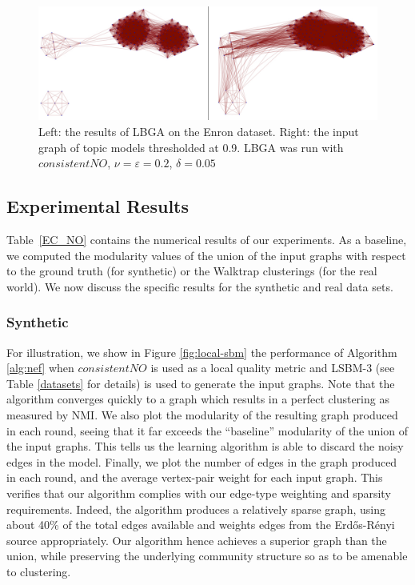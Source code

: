 \documentclass{article}
\newcommand{\er}{Erd\H{o}s-R\'{e}nyi }
\begin{document}
\begin{figure}[t]
\begin{centering}
\includegraphics[width=\columnwidth]{enron-comparison.pdf}
\par\end{centering}
\caption{Left: the results of LBGA on the Enron dataset. Right: the input graph
of topic models thresholded at 0.9. LBGA was run with $consistentNO$, $\nu =
\varepsilon = 0.2$, $\delta = 0.05$} 
\label{fig:enron-comparison}
\end{figure}


\subsection{Experimental Results}
\label{sec:results}

Table~\ref{EC_NO} contains the numerical results of our experiments. As a
baseline, we computed the modularity values of the union of the input
graphs with respect to the ground truth (for synthetic) or the Walktrap
clusterings (for the real world). We now discuss the specific results for the
synthetic and real data sets. 

\subsubsection{Synthetic}
For illustration, we show in Figure \ref{fig:local-sbm} the performance of
Algorithm \ref{alg:nef} when $consistentNO$ is used as a local quality metric
and LSBM-3 (see Table \ref{datasets} for details) is used to generate the input
graphs. Note that the algorithm converges quickly to a graph which results in a
perfect clustering as measured by NMI. We also plot the modularity of the
resulting graph produced in each round, seeing that it far exceeds the
``baseline'' modularity of the union of the input graphs. This tells us the
learning algorithm is able to discard the noisy edges in the model. Finally, we
plot the number of edges in the graph produced in each round, and the average
vertex-pair weight for each input graph. This verifies that our algorithm
complies with our edge-type weighting and sparsity requirements. Indeed, the
algorithm produces a relatively sparse graph, using about 40\% of the total
edges available and weights edges from the \er source appropriately.  Our
algorithm hence achieves a superior graph than the union, while preserving the
underlying community structure so as to be amenable to clustering. 
\end{document}
